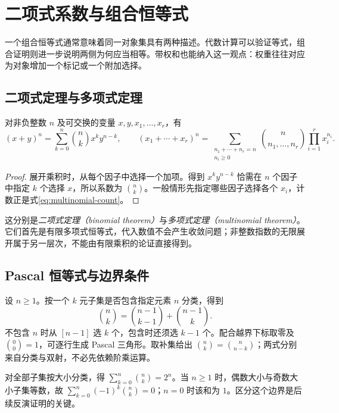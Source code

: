 \setcounter{chapter}{2} %
\chapter{二项式系数与组合恒等式}
\label{ch:identities}

一个组合恒等式通常意味着同一对象集具有两种描述。代数计算可以验证等式，组合证明则进一步说明两侧为何应当相等。带权和也能纳入这一观点：权重往往对应为对象增加一个标记或一个附加选择。

\section{二项式定理与多项式定理}

\begin{theorem}
对非负整数 $n$ 及可交换的变量 $x,y,x_1,\ldots,x_r$，有
\[
  (x+y)^n=\sum_{k=0}^n\binom nk x^ky^{n-k},\qquad
  (x_1+\cdots+x_r)^n=
  \sum_{\substack{n_1+\cdots+n_r=n\\n_i\ge0}}
  \binom{n}{n_1,\ldots,n_r}\prod_{i=1}^r x_i^{n_i}.
\]
\end{theorem}
\begin{proof}
展开乘积时，从每个因子中选择一个加项。得到 $x^ky^{n-k}$ 恰需在 $n$ 个因子中指定 $k$ 个选择 $x$，所以系数为 $\binom nk$。一般情形先指定哪些因子选择各个 $x_i$，计数正是式\eqref{eq:multinomial-count}。
\end{proof}

这分别是\emph{二项式定理（binomial theorem）}与\emph{多项式定理（multinomial theorem）}。它们首先是有限多项式恒等式，代入数值不会产生收敛问题；非整数指数的无限展开属于另一层次，不能由有限乘积的论证直接得到。

\section{Pascal 恒等式与边界条件}

设 $n\ge1$。按一个 $k$ 元子集是否包含指定元素 $n$ 分类，得到
\[
  \binom nk=\binom{n-1}{k-1}+\binom{n-1}{k}.
\]
不包含 $n$ 时从 $[n-1]$ 选 $k$ 个，包含时还须选 $k-1$ 个。配合越界下标取零及 $\binom00=1$，可逐行生成 Pascal 三角形。取补集给出 $\binom nk=\binom n{n-k}$；两式分别来自分类与双射，不必先依赖阶乘运算。

对全部子集按大小分类，得 $\sum_{k=0}^n\binom nk=2^n$。当 $n\ge1$ 时，偶数大小与奇数大小子集等数，故 $\sum_{k=0}^n(-1)^k\binom nk=0$；$n=0$ 时该和为 $1$。区分这个边界是后续反演证明的关键。

